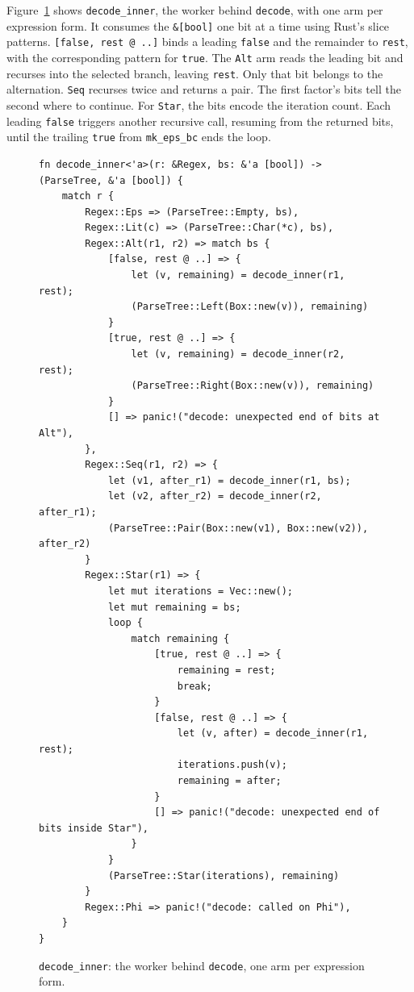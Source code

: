 %

Figure~\ref{fig:decode-inner-rust} shows \texttt{decode\_inner},
the worker behind \texttt{decode}, with one arm per expression form.
It consumes the \texttt{\&[bool]} one bit at a time using Rust's
slice patterns. \texttt{[false, rest @ ..]} binds a leading
\texttt{false} and the remainder to \texttt{rest}, with the
corresponding pattern for \texttt{true}.
The \texttt{Alt} arm reads the leading bit and recurses into
the selected branch, leaving \texttt{rest}. Only that bit
belongs to the alternation.
\texttt{Seq} recurses twice and returns a pair. The first
factor's bits tell the second where to continue.
For \texttt{Star}, the bits encode the iteration count.
Each leading \texttt{false} triggers another recursive call,
resuming from the returned bits, until the trailing
\texttt{true} from \texttt{mk\_eps\_bc} ends the loop.

\begin{figure}[H]
\small
\begin{verbatim}
fn decode_inner<'a>(r: &Regex, bs: &'a [bool]) -> (ParseTree, &'a [bool]) {
    match r {
        Regex::Eps => (ParseTree::Empty, bs),
        Regex::Lit(c) => (ParseTree::Char(*c), bs),
        Regex::Alt(r1, r2) => match bs {
            [false, rest @ ..] => {
                let (v, remaining) = decode_inner(r1, rest);
                (ParseTree::Left(Box::new(v)), remaining)
            }
            [true, rest @ ..] => {
                let (v, remaining) = decode_inner(r2, rest);
                (ParseTree::Right(Box::new(v)), remaining)
            }
            [] => panic!("decode: unexpected end of bits at Alt"),
        },
        Regex::Seq(r1, r2) => {
            let (v1, after_r1) = decode_inner(r1, bs);
            let (v2, after_r2) = decode_inner(r2, after_r1);
            (ParseTree::Pair(Box::new(v1), Box::new(v2)), after_r2)
        }
        Regex::Star(r1) => {
            let mut iterations = Vec::new();
            let mut remaining = bs;
            loop {
                match remaining {
                    [true, rest @ ..] => {
                        remaining = rest;
                        break;
                    }
                    [false, rest @ ..] => {
                        let (v, after) = decode_inner(r1, rest);
                        iterations.push(v);
                        remaining = after;
                    }
                    [] => panic!("decode: unexpected end of bits inside Star"),
                }
            }
            (ParseTree::Star(iterations), remaining)
        }
        Regex::Phi => panic!("decode: called on Phi"),
    }
}
\end{verbatim}
\caption{\texttt{decode\_inner}: the worker behind \texttt{decode},
one arm per expression form.}
\label{fig:decode-inner-rust}
\end{figure}

